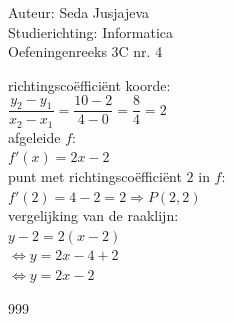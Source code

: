 \documentclass[a4paper]{article}
\begin{document}
\noindent \large Auteur: Seda Jusjajeva\\
\noindent \large Studierichting: Informatica\\
\noindent \large Oefeningenreeks 3C nr. 4 \\

\medskip

\normalsize

richtingscoëfficiënt koorde: \\

$\dfrac{y_2 - y_1}{x_2 - x_1} = \dfrac{10-2}{4-0} = \dfrac{8}{4} = 2$ \\

afgeleide $f$: \\

$f'(x) = 2x - 2$ \\

punt met richtingscoëfficiënt $2$ in $f$: \\

$f'(2) = 4 - 2 = 2 \Rightarrow P(2, 2)$ \\

vergelijking van de raaklijn: \\

$y - 2 = 2(x - 2)$ \\

$\Leftrightarrow y = 2x - 4 + 2$ \\ 

$\Leftrightarrow y = 2x - 2$ \\





\begin{thebibliography}{999}
\end{thebibliography}
\end{document}
